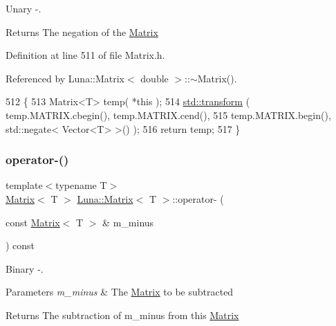 Unary -\/. 

\begin{DoxyReturn}{Returns}
The negation of the \hyperlink{classLuna_1_1Matrix}{Matrix} 
\end{DoxyReturn}


Definition at line 511 of file Matrix.\+h.



Referenced by Luna\+::\+Matrix$<$ double $>$\+::$\sim$\+Matrix().


\begin{DoxyCode}
512   \{
513     Matrix<T> temp( *\textcolor{keyword}{this} );
514     \hyperlink{namespaceHeat__plot_aeaa6785bedcad63b4bd40e8cb1bad8a0}{std::transform} ( temp.MATRIX.cbegin(), temp.MATRIX.cend(),
515                      temp.MATRIX.begin(), std::negate< Vector<T> >() );
516     \textcolor{keywordflow}{return} temp;
517   \}
\end{DoxyCode}
\mbox{\label{classLuna_1_1Matrix_a5b55b33cc912e66b6c1128cff82e2d07}} 
\subsubsection{\texorpdfstring{operator-\/()}{operator-()}\hspace{0.1cm}{\footnotesize\ttfamily [2/2]}}
{\footnotesize\ttfamily template$<$typename T$>$ \\
\hyperlink{classLuna_1_1Matrix}{Matrix}$<$ T $>$ \hyperlink{classLuna_1_1Matrix}{Luna\+::\+Matrix}$<$ T $>$\+::operator-\/ (\begin{DoxyParamCaption}\item[{const \hyperlink{classLuna_1_1Matrix}{Matrix}$<$ T $>$ \&}]{m\+\_\+minus }\end{DoxyParamCaption}) const\hspace{0.3cm}{\ttfamily [inline]}}



Binary -\/. 


\begin{DoxyParams}{Parameters}
{\em m\+\_\+minus} & The \hyperlink{classLuna_1_1Matrix}{Matrix} to be subtracted \\
\hline
\end{DoxyParams}
\begin{DoxyReturn}{Returns}
The subtraction of m\+\_\+minus from this \hyperlink{classLuna_1_1Matrix}{Matrix} 
\end{DoxyReturn}


